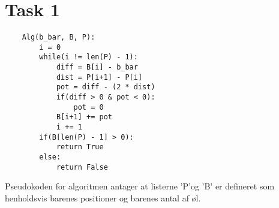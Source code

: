 \section{Task 1}
\begin{lstlisting}
	Alg(b_bar, B, P):
		i = 0
		while(i != len(P) - 1):
			diff = B[i] - b_bar
			dist = P[i+1] - P[i]
			pot = diff - (2 * dist)
			if(diff > 0 & pot < 0):
				pot = 0
			B[i+1] += pot
			i += 1
		if(B[len(P) - 1] > 0):
			return True
		else:
			return False
\end{lstlisting}
Pseudokoden for algoritmen antager at listerne 'P'og 'B' er defineret som henholdsvis barenes positioner og barenes antal af øl. 